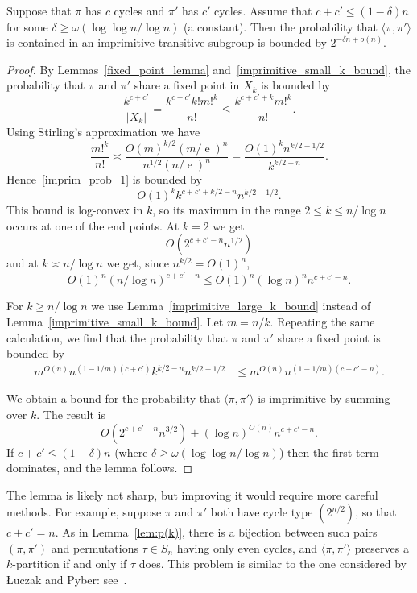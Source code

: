 \documentclass[ALCO,ThmDefs,Unicode,epreuves]{cedram}
\DeclareMathOperator{\expe}{e}
\begin{document}
\begin{lemma} \label{lem:imprimitive-case}
Suppose that $\pi$ has $c$ cycles and $\pi'$ has $c'$ cycles.
Assume that $c + c' \leq (1 - \delta)n$ for some $\delta \geq \omega(\log \log n / \log n)$ (\eg a constant). Then the probability that $\langle \pi, \pi'\rangle$ is contained in an imprimitive transitive subgroup is bounded by $2^{-\delta n + o(n)}$.
\end{lemma}
\begin{proof}
By Lemmas~\ref{fixed_point_lemma} and~\ref{imprimitive_small_k_bound}, the probability that $\pi$ and $\pi'$ share a fixed point in $X_k$ is bounded by
\begin{equation}\label{imprim_prob_1}
 \frac{k^{c + c'}}{|X_k|} = \frac{k^{c + c'} k! m!^k}{n!} \leq \frac{k^{c + 
 c' + k} m!^k}{n!}.
\end{equation}
Using Stirling's approximation we have
\[
 \frac{m!^k}{n!}
 \asymp \frac{O(m)^{k/2} (m/\expe)^n}{n^{1/2} (n/\expe)^n} = \frac{O(1)^k n^{k/2 - 1/2}}{k^{k/2+n}}.
\]
Hence~\eqref{imprim_prob_1} is bounded by
\[
 O(1)^k k^{c + c' + k/2 - n} n^{k/2 - 1/2}.
\]
This bound is log-convex in $k$, so its maximum in the range $2 \leq k \leq n/\log n$ occurs at one of the end points. At $k=2$ we get
\[
 O(2^{c + c' - n} n^{1/2})
\]
and at $k \asymp n / \log n$ we get, since $n^{k/2} = O(1)^n$,
\[
 O(1)^n (n / \log n)^{c + c' - n} \leq O(1)^n (\log n)^n n^{c+c' - n}.
\]

For $k \geq n / \log n$ we use Lemma~\ref{imprimitive_large_k_bound} instead of Lemma~\ref{imprimitive_small_k_bound}. Let $m = n/k$. Repeating the same calculation, we find that the probability that $\pi$ and $\pi'$ share a fixed point is bounded by
\begin{align*}
 m^{O(n)} n^{(1-1/m)(c + c')} k^{k/2 - n} n^{k/2-1/2}
 &\leq m^{O(n)} n^{(1-1/m)(c + c' - n)}.
\end{align*}

We obtain a bound for the probability that $\langle \pi, \pi'\rangle$ is imprimitive by summing over $k$. The result is
\[
 O(2^{c + c' - n} n^{3/2}) + (\log n)^{O(n)} n^{c + c' - n}.
\]
If $c + c' \leq (1-\delta)n$ (where $\delta \geq \omega(\log \log n / \log n)$) then the first term dominates, and the lemma follows.
\end{proof}

\begin{rema}
The lemma is likely not sharp, but improving it would require more careful methods. For example, suppose $\pi$ and $\pi'$ both have cycle type $(2^{n/2})$, so that $c + c' = n$. As in Lemma~\ref{lem:p(k)}, there is a bijection between such pairs $(\pi, \pi')$ and permutations $\tau \in S_n$ having only even cycles, and $\langle \pi, \pi'\rangle$ preserves a $k$-partition if and only if $\tau$ does. This problem is similar to the one considered by {\L}uczak and Pyber: see~\cite{luczak-pyber}.
\end{rema}
\end{document}
